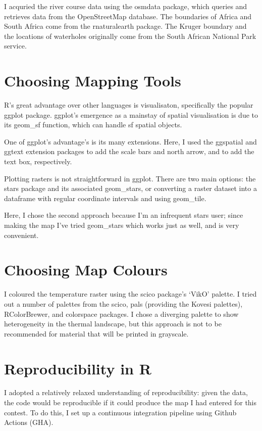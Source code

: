 \begin{tcolorbox}[
  blanker,
  width=0.99\textwidth,
  before skip=6pt,
  colback=gray,
  breakable]
{    I acquried the river course data using the osmdata package, which queries and retrieves data from the OpenStreetMap database. The boundaries of Africa and South Africa come from the rnaturalearth package. The Kruger boundary and the locations of waterholes originally come from the South African National Park service.

    \section{Choosing Mapping Tools}

    R’s great advantage over other languages is visualisaton, specifically the popular ggplot package. ggplot’s emergence as a mainstay of spatial visualisation is due to its geom\_sf function, which can handle sf spatial objects.
    
    One of ggplot’s advantage’s is its many extensions. Here, I used the ggspatial and ggtext extension packages to add the scale bars and north arrow, and to add the text box, respectively.
    
    Plotting rasters is not straightforward in ggplot. There are two main options: the stars package and its associated geom\_stars, or converting a raster dataset into a dataframe with regular coordinate intervals and using geom\_tile.
    
    Here, I chose the second approach because I’m an infrequent stars user; since making the map I’ve tried geom\_stars which works just as well, and is very convenient.

    \section{Choosing Map Colours}

    I coloured the temperature raster using the scico package’s ‘VikO’ palette. I tried out a number of palettes from the scico, pals (providing the Kovesi palettes), RColorBrewer, and colorspace packages. I chose a diverging palette to show heterogeneity in the thermal landscape, but this approach is not to be recommended for material that will be printed in grayscale.

    \section{Reproducibility in R}

    I adopted a relatively relaxed understanding of reproducibility: given the data, the code would be reproducible if it could produce the map I had entered for this contest. To do this, I set up a continuous integration pipeline using Github Actions (GHA).

}
\end{tcolorbox}
